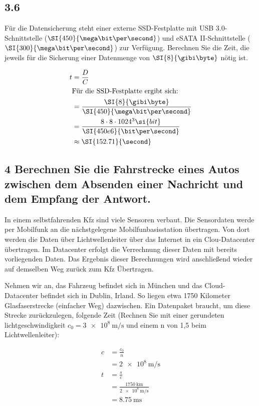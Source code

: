     
    \subsection*{3.6}

    Für die Datensicherung steht einer externe SSD-Festplatte mit USB 3.0-Schnittstelle ($\SI{450}{\mega\bit\per\second}$)
    und eSATA II-Schnittstelle ($\SI{300}{\mega\bit\per\second}$) zur Verfügung. Berechnen Sie die Zeit, die jeweils für
    die Sicherung einer Datenmenge von $\SI{8}{\gibi\byte}$ nötig ist.

    \begin{align}
      t &= \frac{D}{C}\\
      \intertext{
        Für die SSD-Festplatte ergibt sich:
      }
        &= \frac{\SI{8}{\gibi\byte}}{\SI{450}{\mega\bit\per\second}}\\
        &= \frac{8 \cdot 8 \cdot 1024^{3} \si{bit} }{\SI{450e6}{\bit\per\second}}\\
        &\approx \SI{152.71}{\second}\\
    \end{align}

    \subsection*{4 Berechnen Sie die Fahrstrecke eines Autos zwischen dem Absenden einer Nachricht und dem Empfang der Antwort.}

    In einem selbstfahrenden Kfz sind viele Sensoren verbaut. Die Sensordaten werde per Mobilfunk an die nächstgelegene
    Mobilfunbasisstation übertragen. Von dort werden die Daten über Lichtwellenleiter über das Internet in ein Clou-Datacenter übertragen.
    Im Datacenter erfolgt die Verrechnung dieser Daten mit bereits vorliegenden Daten.
    Das Ergebnis dieser Berechnungen wird anschließend wieder auf demselben Weg zurück zum Kfz Übertragen.

    Nehmen wir an, das Fahrzeug befindet sich in München und das Cloud-Datacenter befindet sich in Dublin, Irland.
    So liegen etwa 1750 Kilometer Glasfaserstrecke (einfacher Weg) dazwischen. Ein Datenpaket braucht, um diese Strecke 
    zurückzulegen, folgende Zeit (Rechnen Sie mit einer gerundeten lichtgeschwindigkeit $c_0 = \SI{3e8}{\meter\per\second}$ und einem n von 1,5 beim Lichtwellenleiter):

    \begin{align}
      c &= \frac{c_0}{n}\\
        &= \SI{2e8}{\meter\per\second}\\
      t &= \frac{s}{c}\\
        &= \frac{\SI{1750}{\kilo\meter}}{\SI{2e8}{\meter\per\second}}\\
        &= \SI{8.75}{\milli\second}
    \end{align}

